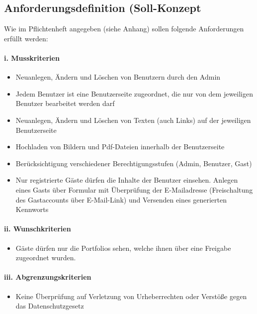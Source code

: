 \documentclass[10pt]{article}
\begin{document}
\subsection{Anforderungsdefinition (Soll-Konzept}

Wie im Pflichtenheft angegeben (siehe Anhang) sollen folgende Anforderungen erfüllt werden:

\paragraph{i. Musskriterien}

\begin{itemize}
\item Neuanlegen, Ändern und Löschen von Benutzern durch den Admin
\item Jedem Benutzer ist eine Benutzerseite zugeordnet, die nur von dem jeweiligen Benutzer bearbeitet werden darf
\item Neuanlegen, Ändern und Löschen von Texten (auch Links) auf der jeweiligen Benutzerseite
\item Hochladen von Bildern und Pdf-Dateien innerhalb der Benutzerseite
\item Berücksichtigung verschiedener Berechtigungsstufen (Admin, Benutzer, Gast)
\item  Nur registrierte Gäste dürfen die Inhalte der Benutzer einsehen. Anlegen eines Gasts über Formular mit Überprüfung der E-Mailadresse (Freischaltung des Gastaccounts über E-Mail-Link) und Versenden eines generierten Kennworts 
\end{itemize}

\paragraph{ii. Wunschkriterien}

\begin{itemize}
\item Gäste dürfen nur die Portfolios sehen, welche ihnen über eine Freigabe zugeordnet wurden.
\end{itemize}

\paragraph{iii. Abgrenzungskriterien}

\begin{itemize}
\item Keine Überprüfung auf Verletzung von Urheberrechten oder Verstöße gegen das    Datenschutzgesetz
\end{itemize}
\end{document}
